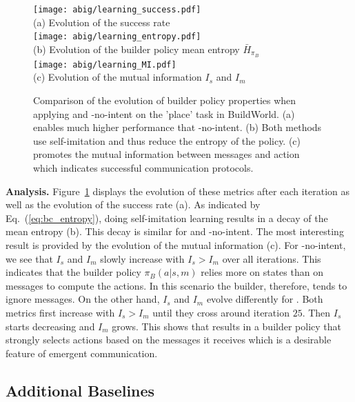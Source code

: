 \begin{figure}[h!]
	\small
    \centering
    \texttt{[image: abig/learning\_success.pdf]}\\
    \small(a) Evolution of the success rate\\
    \texttt{[image: abig/learning\_entropy.pdf]}\\
    \small(b) Evolution of the builder policy mean entropy $\bar{H}_{\pi_B}$\\
    \texttt{[image: abig/learning\_MI.pdf]}\\
    \small(c) Evolution of the mutual information $I_s$ and $I_m$
    \caption{Comparison of the evolution of builder policy properties when applying \abig and \abig-no-intent on the 'place' task in BuildWorld. (a) \abig enables much higher performance that \abig-no-intent. (b) Both methods use self-imitation and thus reduce the entropy of the policy. (c) \abig promotes the mutual information between messages and action which indicates successful communication protocols.}
    \label{sup:fig_learning_metrics}
\end{figure}


\noindent\textbf{Analysis. } Figure~\ref{sup:fig_learning_metrics} displays the evolution of these metrics after each iteration as well as the evolution of the success rate (a). As indicated by Eq.~(\ref{eq:bc_entropy}), doing self-imitation learning results in a decay of the mean entropy (b). This decay is similar for \abig and \abig-no-intent. The most interesting result is provided by the evolution of the mutual information (c). For \abig-no-intent, we see that $I_s$ and $I_m$ slowly increase with $I_s>I_m$ over all iterations. This indicates that the builder policy $\pi_B(a|s,m)$ relies more on states than on messages to compute the actions. In this scenario the builder, therefore, tends to ignore messages. On the other hand, $I_s$ and $I_m$ evolve differently for \abig. Both metrics first increase with $I_s>I_m$ until they cross around iteration $25$. Then $I_s$ starts decreasing and $I_m$  grows. This shows that \abig results in a builder policy that strongly selects actions based on the messages it receives which is a desirable feature of emergent communication.  


\subsection{Additional Baselines}

